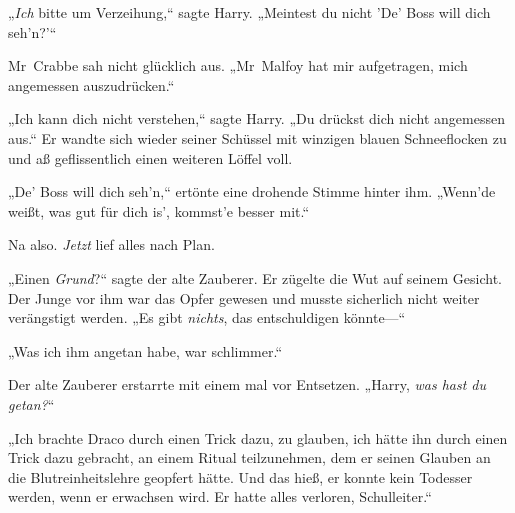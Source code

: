 „\emph{Ich} bitte um Verzeihung,“ sagte Harry. „Meintest du nicht 'De' Boss will dich seh'n?'“

Mr~Crabbe sah nicht glücklich aus. „Mr~Malfoy hat mir aufgetragen, mich angemessen auszudrücken.“

„Ich kann dich nicht verstehen,“ sagte Harry. „Du drückst dich nicht angemessen aus.“ Er wandte sich wieder seiner Schüssel mit winzigen blauen Schneeflocken zu und aß geflissentlich einen weiteren Löffel voll.

„De' Boss will dich seh'n,“ ertönte eine drohende Stimme hinter ihm. „Wenn'de weißt, was gut für dich is', kommst'e besser mit.“

Na also. \emph{Jetzt} lief alles nach Plan.


„Einen \emph{Grund}?“ sagte der alte Zauberer. Er zügelte die Wut auf seinem Gesicht. Der Junge vor ihm war das Opfer gewesen und musste sicherlich nicht weiter verängstigt werden. „Es gibt \emph{nichts}, das entschuldigen könnte—“

„Was ich ihm angetan habe, war schlimmer.“

Der alte Zauberer erstarrte mit einem mal vor Entsetzen. „Harry, \emph{was hast du getan?}“

„Ich brachte Draco durch einen Trick dazu, zu glauben, ich hätte ihn durch einen Trick dazu gebracht, an einem Ritual teilzunehmen, dem er seinen Glauben an die Blutreinheitslehre geopfert hätte. Und das hieß, er konnte kein Todesser werden, wenn er erwachsen wird. Er hatte alles verloren, Schulleiter.“

